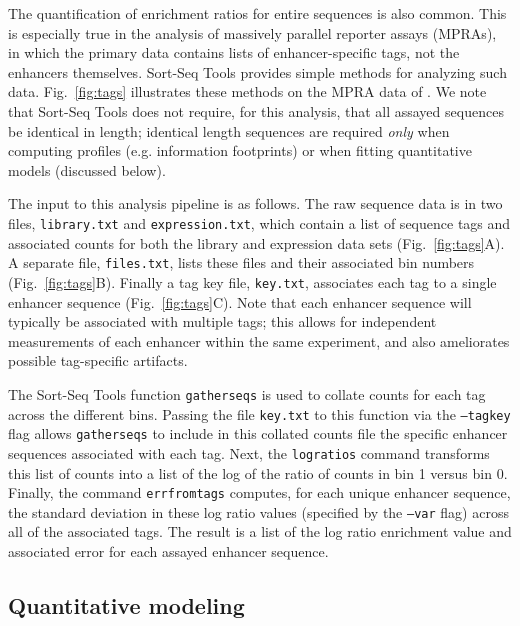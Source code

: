 \documentclass{bmcart}
\newcommand{\fig}[2]{Fig.\ \ref{#1}#2}
\begin{document}
The quantification of enrichment ratios for entire sequences is also common. This is especially true in the analysis of massively parallel reporter assays (MPRAs), in which the primary data contains lists of enhancer-specific tags, not the enhancers themselves. Sort-Seq Tools provides simple methods for analyzing such data. \fig{fig:tags}{} illustrates these methods on the MPRA data of \cite{Melnikov:2012dw}. We note that Sort-Seq Tools does not require, for this analysis, that all assayed sequences be identical in length; identical length sequences are required \emph{only} when computing profiles (e.g. information footprints) or when fitting quantitative models (discussed below). 

The input to this analysis pipeline is as follows. The raw sequence data is in two files, \texttt{library.txt} and \texttt{expression.txt}, which contain a list of sequence tags and associated counts for both the library and expression data sets (\fig{fig:tags}{A}). A separate file, \texttt{files.txt}, lists these files and their associated bin numbers (\fig{fig:tags}{B}). Finally a tag key file, \texttt{key.txt}, associates each tag to a single enhancer sequence (\fig{fig:tags}{C}). Note that each enhancer sequence will typically be associated with multiple tags; this allows for independent measurements of each enhancer within the same experiment, and also ameliorates possible tag-specific artifacts. 

The Sort-Seq Tools function \texttt{gatherseqs} is used to collate counts for each tag across the different bins. Passing the file \texttt{key.txt} to this function via the \texttt{--tagkey} flag allows \texttt{gatherseqs} to include in this collated counts file the specific enhancer sequences associated with each tag. Next, the \texttt{logratios} command transforms this list of counts into a list of the log of the ratio of counts in bin 1 versus bin 0. Finally, the command \texttt{errfromtags} computes, for each unique enhancer sequence, the standard deviation in these log ratio values (specified by the \texttt{--var} flag) across all of the associated tags. The result is a list of the log ratio enrichment value and associated error for each assayed enhancer sequence. 


%
%

\subsection*{Quantitative modeling}
\end{document}
